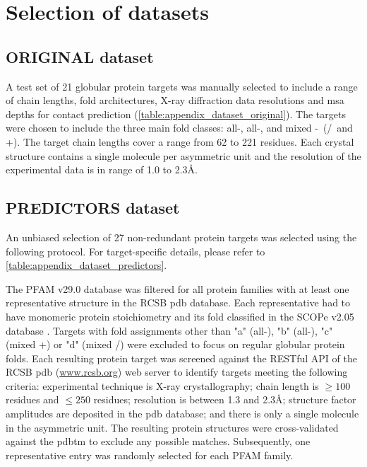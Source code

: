\section{Selection of datasets}
\subsection{ORIGINAL dataset} \label{sec:methods_dataset_original}
A test set of 21 globular protein targets was manually selected to include a range of chain lengths, fold architectures, X-ray diffraction data resolutions and \gls{msa} depths for contact prediction  (\cref{table:appendix_dataset_original}). The targets were chosen to include the three main fold classes: all-\textalpha, all-\textbeta, and mixed \textalpha-\textbeta\ (\textalpha/\textbeta\ and \textalpha+\textbeta). The target chain lengths cover a range from 62 to 221 residues. Each crystal structure contains a single molecule per asymmetric unit and the resolution of the experimental data is in range of 1.0 to 2.3\AA.

\subsection{PREDICTORS dataset} \label{sec:methods_dataset_predictors}
An unbiased selection of 27 non-redundant protein targets was selected using the following protocol. For target-specific details, please refer to \cref{table:appendix_dataset_predictors}.

The PFAM v29.0 \cite{Finn2016-zo} database was filtered for all protein families with at least one representative structure in the RCSB \gls{pdb} \cite{Berman2000-ua} database. Each representative had to have monomeric protein stoichiometry and its fold classified in the SCOPe v2.05 database \cite{Chandonia2017-vf}. Targets with fold assignments other than "a" (all-\textalpha), "b" (all-\textbeta), "c" (mixed \textalpha+\textbeta) or "d" (mixed \textalpha/\textbeta) were excluded to focus on regular globular protein folds. Each resulting protein target was screened against the RESTful API of the RCSB \gls{pdb} (\url{www.rcsb.org}) web server to identify targets meeting the following criteria: experimental technique is X-ray crystallography; chain length is $\geq100$ residues and $\leq250$ residues; resolution is between 1.3 and 2.3\AA; structure factor amplitudes are deposited in the \gls{pdb} \cite{Berman2000-ua} database; and there is only a single molecule in the asymmetric unit. The resulting protein structures were cross-validated against the \gls{pdbtm} \cite{Tusnady2005-ns} to exclude any possible matches. Subsequently, one representative entry was randomly selected for each PFAM family.

